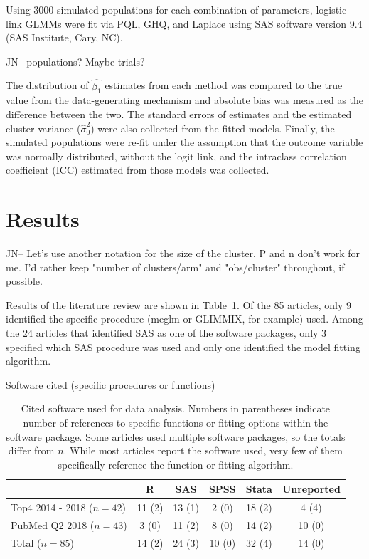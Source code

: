\documentclass{article}
\begin{document}
\begin{flushleft}
Using 3000 simulated populations for each combination of parameters, logistic-link GLMMs were fit via PQL, GHQ, and Laplace using SAS software version 9.4 (SAS Institute, Cary, NC).

JN-- populations?  Maybe trials?

The distribution of $\hat{\beta_1}$ estimates from each method was compared to the true value from the data-generating mechanism and absolute bias was measured as the difference between the two. The standard errors of estimates and the estimated cluster variance ($\hat{\sigma}^2_0$) were also collected from the fitted models. Finally, the simulated populations were re-fit under the assumption that the outcome variable was normally distributed, without the logit link, and the intraclass correlation coefficient (ICC) estimated from those models was collected.




\section{Results}


JN-- Let's use another notation for the size of the cluster.  P and n don't work for me.  I'd rather keep "number of clusters/arm" and "obs/cluster" throughout, if possible.


Results of the literature review are shown in Table~\ref{tab:lit_review}. Of the 85 articles, only 9 identified the specific procedure (meglm or GLIMMIX, for example) used. Among the 24 articles that identified SAS as one of the software packages, only 3 specified which SAS procedure was used and only one identified the model fitting algorithm.

\begin{table}[]
\centering
Software cited (specific procedures or functions)
 \begin{tabular}{ |l||c|c|c|c|c| } 
 \hline
      & R & SAS & SPSS & Stata & Unreported\\ 
     \hline
    Top4 2014 - 2018 ($n=42$) & 11 (2) & 13 (1) & 2 (0) & 18 (2) & 4 (4)  \\ 
    PubMed Q2 2018 ($n=43$) & 3 (0) & 11 (2) & 8 (0) & 14 (2) & 10 (0) \\ 
    \hline
    Total ($n=85$) & 14 (2) & 24 (3) & 10 (0) & 32 (4) & 14 (0) \\ 
\hline
 \end{tabular}
    \caption{Cited software used for data analysis. Numbers in parentheses indicate number of references to specific functions or fitting options within the software package. Some articles used multiple software packages, so the totals differ from $n$. While most articles report the software used, very few of them specifically reference the function or fitting algorithm.}
    \label{tab:lit_review}
\end{table}


\end{flushleft}
\end{document}
